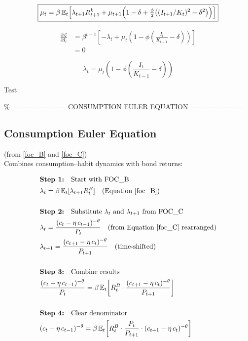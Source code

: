 \documentclass[11pt,preprint]{elsarticle}
\numberwithin{equation}{section}
\numberwithin{figure}{section}
\numberwithin{table}{section}
\begin{document}
\begin{equation}\label{foc_K}
  \boxed{%
    \mu_t
    = \beta\,\mathbb{E}_t\Bigl[
        \lambda_{t+1}R^k_{t+1}
      + \mu_{t+1}\Bigl(
          1-\delta
        + \tfrac{\phi}{2}\bigl((I_{t+1}/K_t)^2 - \delta^2\bigr)
      \Bigr)
    \Bigr]
  }
\end{equation}

\begin{align*}
\frac{\partial \mathcal{L}}{\partial I_t}
&= \beta^{t-1} \left[ 
   -\lambda_t 
   + \mu_t \left( 
        1 
        - \phi \left( \frac{I_t}{K_{t-1}} - \delta \right) 
     \right)
\right] \\
&= 0
\end{align*}

\begin{equation}\label{foc_I}
\boxed{
  \lambda_t 
  = \mu_t 
    \left( 1 
      - \phi 
        \left( \frac{I_t}{K_{t-1}} - \delta \right)
    \right)
}
\end{equation}

Test \newpage

\% ========== CONSUMPTION EULER EQUATION ==========

\subsection*{Consumption Euler Equation}

(from \eqref{foc_B} and \eqref{foc_C})\\
Combines consumption--habit dynamics with bond returns:

\begin{align*}
& \textbf{Step 1:} \quad \text{Start with FOC\_B} \\
& \lambda_t = \beta\,\mathbb{E}_t[\lambda_{t+1}R_t^B] \quad \text{(Equation \ref{foc_B})} \\
& \\
& \textbf{Step 2:} \quad \text{Substitute } \lambda_t \text{ and } \lambda_{t+1} \text{ from FOC\_C} \\
& \lambda_t = \frac{(c_t - \eta\,c_{t-1})^{-\theta}}{P_t} \quad \text{(from Equation \ref{foc_C} rearranged)} \\
& \lambda_{t+1} = \frac{(c_{t+1} - \eta\,c_t)^{-\theta}}{P_{t+1}} \quad \text{(time-shifted)} \\
& \\
& \textbf{Step 3:} \quad \text{Combine results} \\
& \frac{(c_t - \eta\,c_{t-1})^{-\theta}}{P_t} = \beta\,\mathbb{E}_t\!\left[ R_t^B \cdot \frac{(c_{t+1} - \eta\,c_t)^{-\theta}}{P_{t+1}} \right] \\
& \\
& \textbf{Step 4:} \quad \text{Clear denominator} \\
& (c_t - \eta\,c_{t-1})^{-\theta} = \beta\,\mathbb{E}_t\!\left[ R_t^B \cdot \frac{P_t}{P_{t+1}} \cdot (c_{t+1} - \eta\,c_t)^{-\theta} \right]
\end{align*}
\end{document}
